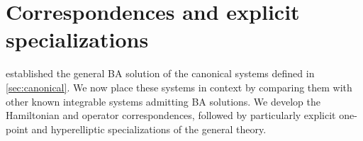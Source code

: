 \section{Correspondences and explicit specializations}
\label{sec:correspondences-specializations}

 established the general BA solution of
the canonical systems defined in \cref{sec:canonical}. We now place
these systems in context by comparing them with other known
integrable systems admitting BA solutions. We develop the Hamiltonian
and operator correspondences, followed by particularly explicit
one-point and hyperelliptic specializations of the general theory.
